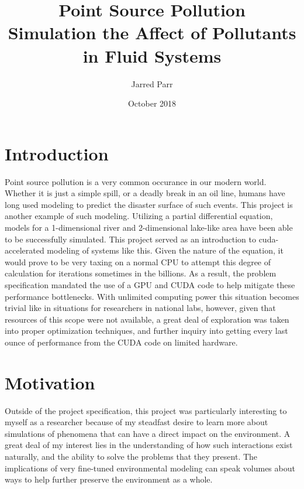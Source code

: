 \documentclass[11pt]{article}
\begin{document}
\title{%
  Point Source Pollution \\
  \large Simulation the Affect of Pollutants in Fluid Systems}
\author{Jarred Parr}

\date{October 2018}
\maketitle

\section{Introduction}
Point source pollution is a very common occurance in our modern world. Whether it is just a simple spill, or a deadly break in an oil line, humans have long used modeling to predict the disaster surface of such events. This project is another example of such modeling. Utilizing a partial differential equation, models for a 1-dimensional river and 2-dimensional lake-like area have been able to be successfully simulated. This project served as an introduction to cuda-accelerated modeling of systems like this. Given the nature of the equation, it would prove to be very taxing on a normal CPU to attempt this degree of calculation for iterations sometimes in the billions. As a result, the problem specification mandated the use of a GPU and CUDA code to help mitigate these performance bottlenecks. With unlimited computing power this situation becomes trivial like in situations for researchers in national labs, however, given that resources of this scope were not available, a great deal of exploration was taken into proper optimization techniques, and further inquiry into getting every last ounce of performance from the CUDA code on limited hardware.

\section{Motivation}
Outside of the project specification, this project was particularly interesting to myself as a researcher because of my steadfast desire to learn more about simulations of phenomena that can have a direct impact on the environment. A great deal of my interest lies in the understanding of how such interactions exist naturally, and the ability to solve the problems that they present. The implications of very fine-tuned environmental modeling can speak volumes about ways to help further preserve the environment as a whole.
\end{document}
